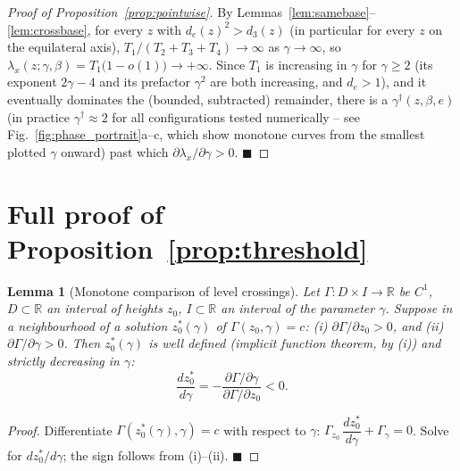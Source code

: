 \documentclass[11pt,a4paper]{article}
\theoremstyle{plain}
\newtheorem{lemma}[theorem]{Lemma}
\theoremstyle{definition}
\theoremstyle{remark}
\newcommand{\R}{\mathbb{R}}
\newcommand{\lam}{\lambda}
\newcommand{\bw}{\beta}
\newcommand{\de}{d_e}
\newcommand{\dth}{d_3}
\begin{document}
\begin{proof}[Proof of Proposition~\ref{prop:pointwise}]
By Lemmas~\ref{lem:samebase}--\ref{lem:crossbase}, for every $z$ with
$\de(z)^2>\dth(z)$ (in particular for every $z$ on the equilateral axis),
$T_1/(T_2+T_3+T_4)\to\infty$ as $\gamma\to\infty$, so
$\lam_x(z;\gamma,\bw)=T_1\big(1-o(1)\big)\to+\infty$. Since $T_1$ is
increasing in $\gamma$ for $\gamma\ge2$ (its exponent $2\gamma-4$ and its
prefactor $\gamma^2$ are both increasing, and $\de>1$), and it eventually
dominates the (bounded, subtracted) remainder, there is a
$\gamma^\dagger(z,\bw,e)$ (in practice $\gamma^\dagger\approx2$ for all
configurations tested numerically -- see Fig.~\ref{fig:phase_portrait}a--c,
which show monotone curves from the smallest plotted $\gamma$ onward) past
which $\partial\lam_x/\partial\gamma>0$. $\blacksquare$
\end{proof}

\section{Full proof of Proposition~\ref{prop:threshold}}
\label{app:threshold_proof}

\begin{lemma}[Monotone comparison of level crossings]
\label{lem:crossing}
Let $\Gamma:D\times I\to\R$ be $C^1$, $D\subset\R$ an interval of heights
$z_0$, $I\subset\R$ an interval of the parameter $\gamma$. Suppose in a
neighbourhood of a solution $z_0^*(\gamma)$ of $\Gamma(z_0,\gamma)=c$:
(i) $\partial\Gamma/\partial z_0>0$, and (ii) $\partial\Gamma/\partial\gamma>0$.
Then $z_0^*(\gamma)$ is well defined (implicit function theorem, by (i))
and strictly decreasing in $\gamma$:
\[
\frac{dz_0^*}{d\gamma}=-\frac{\partial\Gamma/\partial\gamma}{\partial\Gamma/\partial z_0}<0.
\]
\end{lemma}
\begin{proof}
Differentiate $\Gamma(z_0^*(\gamma),\gamma)=c$ with respect to $\gamma$:
$\Gamma_{z_0}\,\dfrac{dz_0^*}{d\gamma}+\Gamma_\gamma=0$. Solve for
$dz_0^*/d\gamma$; the sign follows from (i)--(ii). $\blacksquare$
\end{proof}
\end{document}
